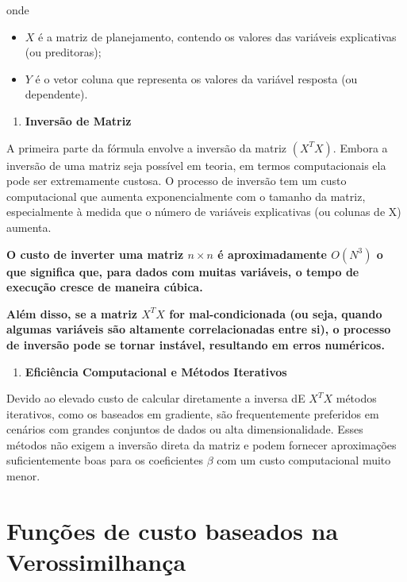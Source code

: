 \documentclass[
  letterpaper,
  DIV=11,
  numbers=noendperiod]{scrreprt}
\providecommand{\tightlist}{%
  \setlength{\itemsep}{0pt}\setlength{\parskip}{0pt}}\usepackage{longtable,booktabs,array}
\begin{document}
onde

\begin{itemize}
\item
  \(X\) é a matriz de planejamento, contendo os valores das variáveis
  explicativas (ou preditoras);
\item
  \(Y\) é o vetor coluna que representa os valores da variável resposta
  (ou dependente).
\end{itemize}

\begin{enumerate}
\def\labelenumi{\arabic{enumi}.}
\tightlist
\item
  \textbf{Inversão de Matriz}
\end{enumerate}

A primeira parte da fórmula envolve a inversão da matriz \((X^TX)\).
Embora a inversão de uma matriz seja possível em teoria, em termos
computacionais ela pode ser extremamente custosa. O processo de inversão
tem um custo computacional que aumenta exponencialmente com o tamanho da
matriz, especialmente à medida que o número de variáveis explicativas
(ou colunas de X) aumenta.

\textbf{O custo de inverter uma matriz \(n \times n\) é aproximadamente
\(O(N^3)\) o que significa que, para dados com muitas variáveis, o tempo
de execução cresce de maneira cúbica.}

\textbf{Além disso, se a matriz \(X^TX\) for mal-condicionada (ou seja,
quando algumas variáveis são altamente correlacionadas entre si), o
processo de inversão pode se tornar instável, resultando em erros
numéricos.}

\begin{enumerate}
\def\labelenumi{\arabic{enumi}.}
\setcounter{enumi}{1}
\tightlist
\item
  \textbf{Eficiência Computacional e Métodos Iterativos}
\end{enumerate}

Devido ao elevado custo de calcular diretamente a inversa dE \(X^TX\)
métodos iterativos, como os baseados em gradiente, são frequentemente
preferidos em cenários com grandes conjuntos de dados ou alta
dimensionalidade. Esses métodos não exigem a inversão direta da matriz e
podem fornecer aproximações suficientemente boas para os coeficientes
\(\beta\) com um custo computacional muito menor.


\hypertarget{funuxe7uxf5es-de-custo-baseados-na-verossimilhanuxe7a}{%
\chapter{Funções de custo baseados na
Verossimilhança}\label{funuxe7uxf5es-de-custo-baseados-na-verossimilhanuxe7a}}
\end{document}
